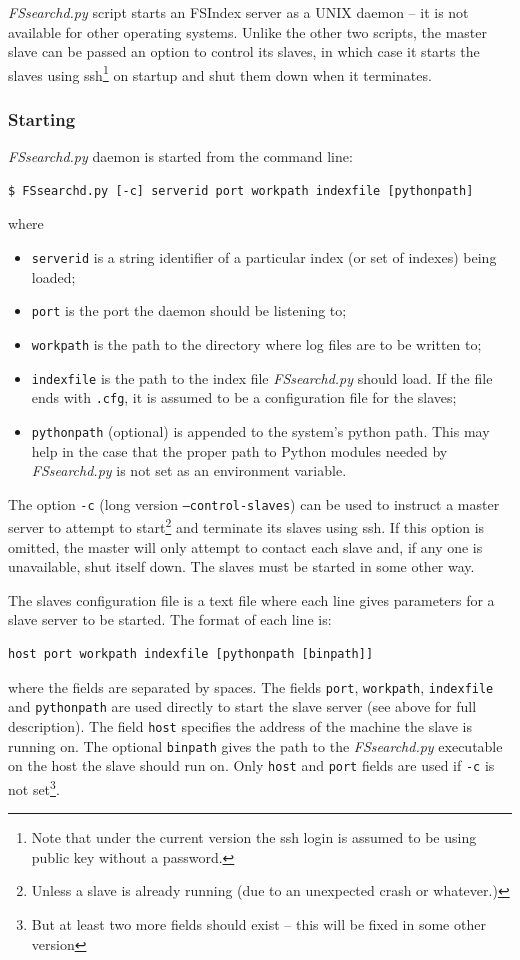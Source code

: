 \documentclass[11pt]{article}
\begin{document}
\textit{FSsearchd.py} script starts an FSIndex server as a UNIX daemon -- it is not available for other operating systems. Unlike the other two scripts, the master slave can be passed an option to control its slaves, in which case it starts the slaves using ssh\footnote{Note that under the current version the ssh login is assumed to be using public key without a password.} on startup and shut them down when it terminates.

\subsubsection{Starting}

\textit{FSsearchd.py} daemon is started from the command line:
\begin{verbatim}
$ FSsearchd.py [-c] serverid port workpath indexfile [pythonpath]
\end{verbatim}
where
\begin{itemize}
\item \texttt{serverid} is a string identifier of a particular index (or set of indexes) being loaded;
\item \texttt{port} is the port the daemon should be listening to;
\item \texttt{workpath} is the path to the directory where log files are to be written to;
\item \texttt{indexfile} is the path to the index file \textit{FSsearchd.py} should load. If the file ends with \texttt{.cfg}, it is assumed to be a configuration file for the slaves;
\item \texttt{pythonpath} (optional) is appended to the system's python path. This may help in the case that the proper path to Python modules needed by \textit{FSsearchd.py} is not set as an environment variable.
\end{itemize}

The option \texttt{-c} (long version \texttt{--control-slaves}) can be used to instruct a master server to attempt to start\footnote{Unless a slave is already running (due to an unexpected crash or whatever.)} and terminate its slaves using ssh. If this option is omitted, the master will only attempt to contact each slave and, if any one is unavailable, shut itself down. The slaves must be started in some other way.

The slaves configuration file is a text file where each line gives parameters for a slave server to be started. The format of each line is:
\begin{verbatim}
host port workpath indexfile [pythonpath [binpath]]
\end{verbatim}
where the fields are separated by spaces. The fields \texttt{port}, \texttt{workpath}, \texttt{indexfile} and \texttt{pythonpath} are used directly to start the slave server (see above for full description). The field \texttt{host} specifies the address of the machine the slave is running on. The optional \texttt{binpath} gives the path to the \textit{FSsearchd.py} executable on the host the slave should run on. Only \texttt{host} and \texttt{port} fields are used if \texttt{-c} is not set\footnote{But at least two more fields should exist -- this will be fixed in some other version}.
\end{document}
